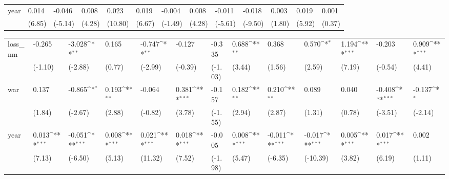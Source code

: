 \begin{tabular}{p{1.5cm} p{1.7cm} p{1.7cm} p{1.7cm} p{1.7cm} p{1.7cm} p{1.7cm} p{1.7cm} p{1.7cm} p{1.7cm} p{1.7cm} p{1.7cm} p{1.7cm}}
year            &    0.014\sym{***}&   -0.046\sym{***}&    0.008\sym{***}&    0.023\sym{***}&    0.019\sym{***}&   -0.004         &    0.008\sym{***}&   -0.011\sym{***}&   -0.018\sym{***}&    0.003         &    0.019\sym{***}&    0.001         \\
                &   (6.85)         &  (-5.14)         &   (4.28)         &  (10.80)         &   (6.67)         &  (-1.49)         &   (4.28)         &  (-5.61)         &  (-9.50)         &   (1.80)         &   (5.92)         &   (0.37)         \\
\end{tabular}
\def\sym#1{\ifmmode^{#1}\else\(^{#1}\)\fi}
\begin{tabular}{p{1.5cm} p{1.7cm} p{1.7cm} p{1.7cm} p{1.7cm} p{1.7cm} p{1.7cm} p{1.7cm} p{1.7cm} p{1.7cm} p{1.7cm} p{1.7cm} p{1.7cm}}
\hline
loss\_nm         &   -0.265         &   -3.028\sym{**} &    0.165         &   -0.747\sym{**} &   -0.127         &   -0.335         &    0.688\sym{**} &    0.368         &    0.570\sym{*}  &    1.194\sym{***}&   -0.203         &    0.909\sym{***}\\
                &  (-1.10)         &  (-2.88)         &   (0.77)         &  (-2.99)         &  (-0.39)         &  (-1.03)         &   (3.44)         &   (1.56)         &   (2.59)         &   (7.19)         &  (-0.54)         &   (4.41)         \\
war             &    0.137         &   -0.865\sym{*}  &    0.193\sym{**} &   -0.064         &    0.381\sym{***}&   -0.157         &    0.182\sym{**} &    0.210\sym{**} &    0.089         &    0.040         &   -0.408\sym{***}&   -0.137\sym{*}  \\
                &   (1.84)         &  (-2.67)         &   (2.88)         &  (-0.82)         &   (3.78)         &  (-1.55)         &   (2.94)         &   (2.87)         &   (1.31)         &   (0.78)         &  (-3.51)         &  (-2.14)         \\
year            &    0.013\sym{***}&   -0.051\sym{***}&    0.008\sym{***}&    0.021\sym{***}&    0.018\sym{***}&   -0.005         &    0.008\sym{***}&   -0.011\sym{***}&   -0.017\sym{***}&    0.005\sym{***}&    0.017\sym{***}&    0.002         \\
                &   (7.13)         &  (-6.50)         &   (5.13)         &  (11.32)         &   (7.52)         &  (-1.98)         &   (5.47)         &  (-6.35)         & (-10.39)         &   (3.82)         &   (6.19)         &   (1.11)         \\
\end{tabular}
